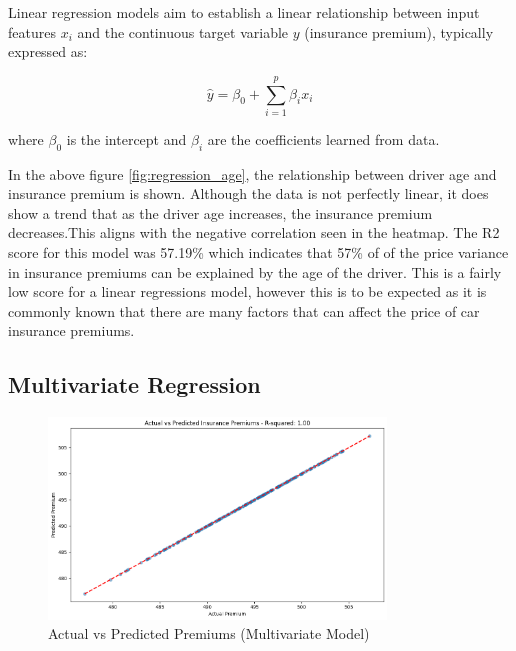 \documentclass{article}
\begin{document}
Linear regression models aim to establish a linear relationship between input features $x_i$ and the continuous target variable $y$ (insurance premium), typically expressed as:

$$
\hat{y} = \beta_0 + \sum_{i=1}^p \beta_i x_i
$$

where $\beta_0$ is the intercept and $\beta_i$ are the coefficients learned from data\cite{hastie_09_elements-of.statistical-learning}.




In the above figure \ref{fig:regression_age}, the relationship between driver age and insurance premium is shown. Although the data is not perfectly linear, it does show a trend that as the driver age increases, the insurance premium decreases.This aligns with the negative correlation seen in the heatmap. The R2 score for this model was 57.19\% which indicates that 57\% of of the price variance in insurance premiums can be explained by the age of the driver. This is a fairly low score for a linear regressions model, however this is to be expected as it is commonly known that there are many factors that can affect the price of car insurance premiums.
\subsection{Multivariate Regression}
\begin{figure}[h]
\centering
\includegraphics[width=0.8\textwidth]{actual_vs_predicted.png}
\caption{Actual vs Predicted Premiums (Multivariate Model)}\label{fig:multivariate_regression}
\end{figure}
\end{document}
